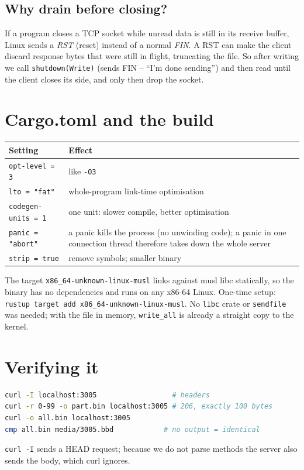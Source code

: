 \documentclass[11pt]{article}
\begin{document}
\subsection{Why drain before closing?}
If a program closes a TCP socket while unread data is still in its receive buffer, Linux sends a \emph{RST} (reset) instead of a normal \emph{FIN}. A RST can make the client discard response bytes that were still in flight, truncating the file. So after writing we call \texttt{shutdown(Write)} (sends FIN -- ``I'm done sending'') and then read until the client closes its side, and only then drop the socket.

\section{Cargo.toml and the build}
\begin{center}\begin{tabular}{lp{}}\toprule
Setting & Effect \\\midrule
\texttt{opt-level = 3} & like \texttt{-O3} \\
\texttt{lto = "fat"} & whole-program link-time optimisation \\
\texttt{codegen-units = 1} & one unit: slower compile, better optimisation \\
\texttt{panic = "abort"} & a panic kills the process (no unwinding code); a panic in one connection thread therefore takes down the whole server \\
\texttt{strip = true} & remove symbols; smaller binary \\
\bottomrule\end{tabular}\end{center}
The target \texttt{x86\_64-unknown-linux-musl} links against musl libc statically, so the binary has no dependencies and runs on any x86-64 Linux. One-time setup: \texttt{rustup target add x86\_64-unknown-linux-musl}. No \texttt{libc} crate or \texttt{sendfile} was needed; with the file in memory, \texttt{write\_all} is already a straight copy to the kernel.

\section{Verifying it}
\begin{lstlisting}[language=bash]
curl -I localhost:3005                  # headers
curl -r 0-99 -o part.bin localhost:3005 # 206, exactly 100 bytes
curl -o all.bin localhost:3005
cmp all.bin media/3005.bbd            # no output = identical
\end{lstlisting}
\texttt{curl -I} sends a HEAD request; because we do not parse methods the server also sends the body, which curl ignores.
\end{document}
